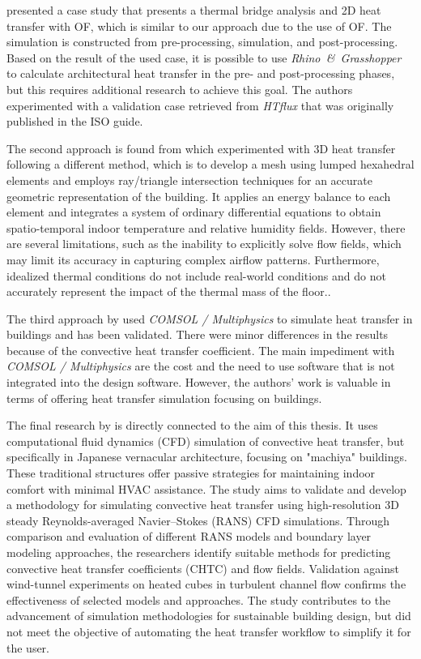 \citeauthor{kastner2020solving} \cite{kastner2020solving} presented a case study that presents a thermal bridge analysis and 2D heat transfer with \gls{OF}, which is similar to our approach due to the use of \gls{OF}. The simulation is constructed from pre-processing, simulation, and post-processing. 
Based on the result of the used case, it is possible to use \textit{Rhino\ \&\ Grasshopper} to calculate architectural heat transfer in the pre- and post-processing phases, but this requires additional research to achieve this goal. 
The authors experimented with a validation case retrieved from \textit{HTflux} that was originally published in the ISO guide. 

The second approach is found from \citeauthor{Yang} \cite{Yang} which experimented with 3D heat transfer following a different method, which is to develop a mesh using lumped hexahedral elements and employs ray/triangle intersection techniques for an accurate geometric representation of the building. 
It applies an energy balance to each element and integrates a system of ordinary differential equations to obtain spatio-temporal indoor temperature and relative humidity fields. 
However, there are several limitations, such as the inability to explicitly solve flow fields, which may limit its accuracy in capturing complex airflow patterns. 
Furthermore, idealized thermal conditions do not include real-world conditions and do not accurately represent the impact of the thermal mass of the floor.. 


The third approach by  \citeauthor{COMSOL}  \cite{COMSOL} used \textit{COMSOL / Multiphysics} to simulate heat transfer in buildings and has been validated. There were minor differences in the results because of the convective heat transfer coefficient. 
The main impediment with \textit{COMSOL / Multiphysics} are the cost and the need to use software that is not integrated into the design software.
However, the authors' work is valuable in terms of offering heat transfer simulation focusing on buildings.  %

The final research by \citeauthor{litrev2} \cite{litrev2} is directly connected to the aim of this thesis. 
It uses computational fluid dynamics (CFD) simulation of convective heat transfer, but specifically in Japanese vernacular architecture, focusing on "machiya" buildings. These traditional structures offer passive strategies for maintaining indoor comfort with minimal HVAC assistance. The study aims to validate and develop a methodology for simulating convective heat transfer using high-resolution 3D steady Reynolds-averaged Navier–Stokes (RANS) CFD simulations. Through comparison and evaluation of different RANS models and boundary layer modeling approaches, the researchers identify suitable methods for predicting convective heat transfer coefficients (\gls{CHTC}) and flow fields. Validation against wind-tunnel experiments on heated cubes in turbulent channel flow confirms the effectiveness of selected models and approaches. The study contributes to the advancement of simulation methodologies for sustainable building design, but did not meet the objective of automating the heat transfer workflow to simplify it for the user. 




